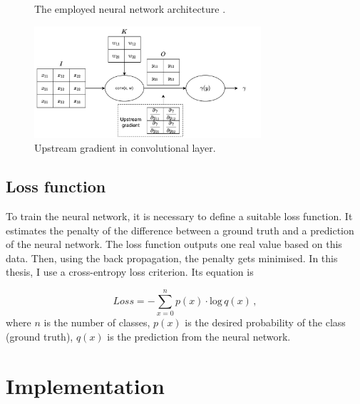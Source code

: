 \begin{figure}[H]
  \centering
  
  
  
  \caption{The employed neural network architecture \cite{giusti2016machine}.}
  \label{fig:architecture}
\end{figure}




\begin{figure}[!h]

  \centering
  \includegraphics[width=0.75\textwidth]{./fig/photos/Conv_BP.pdf}
  \caption{Upstream gradient in convolutional layer.}
  \label{fig:conv_bp}
\end{figure}



\section{Loss function}

To train the neural network, it is necessary to define a suitable loss function. It estimates the penalty of the difference between a ground truth and a prediction of the neural network. The loss function outputs one real value based on this data. Then, using the back propagation, the penalty gets minimised. In this thesis, I use a cross-entropy loss criterion. Its equation is

\begin{equation}
	Loss = -\sum\limits_{x=0}^n p(x)\cdot \textrm{log} \,q(x) \,,
\end{equation}
where $n$ is the number of classes, $p(x)$ is the desired probability of the class (ground truth), $q(x)$ is the prediction from the neural network.




\chapter{Implementation}

